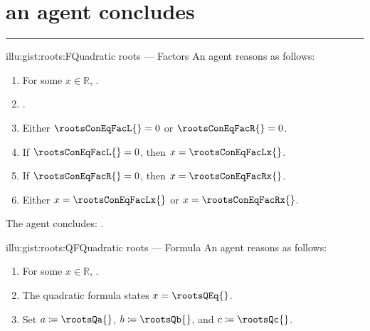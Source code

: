 \documentclass[10pt]{article}
\begin{document}
\section{ an agent concludes}
\label{sec:overview}

\begin{note}
  \par\noindent\rule{\textwidth}{0.4pt}
  \begin{minipage}{.5\linewidth}
    \begin{rscenariox}{illu:gist:roots:F}{Quadratic roots --- Factors}%
      An agent reasons as follows:
      \begin{enumerate}[label=\arabic*., ref=\arabic*]
      \item
        \label{illu:gist:roots:F:eq}
        For some \(x \in \mathbb{R}\), \rootsConEq{}.
      \item
        \label{illu:gist:roots:F:factor}
        \rootsConEqFac{}.
      \item
        \label{illu:gist:roots:F:zero}
        Either \(\rootsConEqFacL{} = 0\) or \(\rootsConEqFacR{} = 0\).
      \item
        \label{illu:gist:roots:F:case:a}
        If \(\rootsConEqFacL{} = 0\), then \(x = \rootsConEqFacLx{}\).
      \item
        \label{illu:gist:roots:F:case:b}
        If \(\rootsConEqFacR{} = 0\), then \(x = \rootsConEqFacRx{}\).
      \item
        \label{illu:gist:roots:F:factor:done}
        Either \(x = \rootsConEqFacLx{}\) or \(x = \rootsConEqFacRx{}\).
      \end{enumerate}
      The agent concludes:
      \rootsCon{}.
    \end{rscenariox}
  \end{minipage}
  \begin{minipage}{.5\linewidth}
    \begin{rscenariox}{illu:gist:roots:QF}{Quadratic roots --- Formula}%
      An agent reasons as follows:
      \begin{enumerate}[label=\arabic*., ref=\arabic*]
      \item
        \label{illu:gist:roots:QF:eq}
        For some \(x \in \mathbb{R}\), \rootsConEq{}.
      \item
        \label{illu:gist:roots:QF:qf}
        The quadratic formula states \(x = \rootsQEq{}\).
      \item
        \label{illu:gist:roots:QF:subs}
        Set \(a \coloneq \rootsQa{}\), \(b \coloneq \rootsQb{}\), and \(c \coloneq \rootsQc{}\).%

\end{enumerate}
\end{rscenariox}
\end{minipage}
\end{note}
\end{document}
